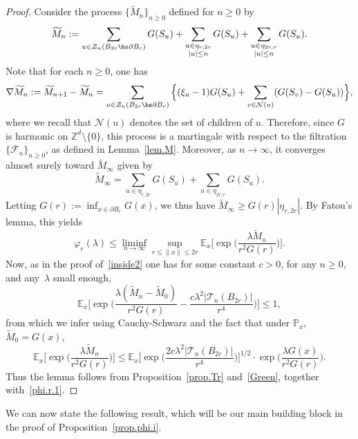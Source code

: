 \begin{proof}
Consider the process $\{\widetilde M_n\}_{n\ge 0}$
defined for $n\ge 0$ by
\begin{equation*}
\widetilde M_n := \sum_{u\in \mathcal Z_n(B_{2r}\bs \partial B_r)} G(S_u) +
\sum_{\substack{u\in \eta_{r,2r}\\ |u|\le n}}G(S_u)+
\sum_{\substack{u\in \eta_{2r,r}\\ |u|\le n}} G(S_u).
\end{equation*}
Note that for each $n\ge 0$, one has
\[
\nabla \widetilde M_n:= \widetilde M_{n+1}- \widetilde M_n =
\sum_{u\in \mathcal Z_n(B_{2r}\bs \partial B_r)}
\Big\{(\xi_u-1)G(S_u) + \sum_{v\in \mathcal N(u)}(G(S_v) - G(S_u))\Big\},
\]
where we recall that $\mathcal N(u)$ denotes the set of children of $u$.
Therefore, since $G$ is harmonic on $\mathbb Z^d\setminus \{0\}$, this process is a martingale with respect to the filtration
$\{\mathcal F_n\}_{n\ge 0}$, as defined in Lemma~\ref{lem.M}.
Moreover, as $n\to \infty$, it converges almost surely toward $\widetilde M_\infty$ given by
\begin{equation*}
\widetilde M_\infty = \sum_{u\in \eta_{r,2r}} G(S_u) + \sum_{u\in \eta_{2r,r}} G(S_u).
\end{equation*}
Letting $G(r):= \inf_{x\in \partial B_r} G(x)$, we thus have
$\widetilde M_\infty \ge G(r) |\eta_{r,2r}|$.
By Fatou's lemma, this yields
\begin{equation}\label{phi.r.1}
\varphi_r(\lambda) \le \liminf_{n\to \infty}\sup_{r\le \|x\|\le 2r}
\mathbb E_x\Big[\exp\Big(\frac{\lambda \widetilde M_n}{r^2G(r)}\Big)\Big].
\end{equation}
Now, as in the proof of~\eqref{inside2} one has for some constant $c>0$, for any $n\ge 0$, and any~$\lambda$ small enough,
\[
\mathbb E_x\Big[\exp\Big(\frac{\lambda (\widetilde M_n-\widetilde M_0)}
{r^2G(r)} - \frac{c\lambda^2|\mathcal T_n(B_{2r})|}{r^4}\Big)\Big] \le 1,
\]
from which we infer using Cauchy-Schwarz and the fact that under $\mathbb P_x$,
$\widetilde M_0=G(x)$,
\begin{equation*}
\mathbb E_x\Big[\exp\Big(\frac{\lambda \widetilde M_n}{r^2G(r)}\Big)\Big]
\le \mathbb E_x\Big[\exp\Big(\frac{2c\lambda^2
|\mathcal T_n(B_{2r})|}{r^4}\Big)\Big]^{1/2}
\cdot \exp\Big(\frac{\lambda G(x)}{r^2G(r)}\Big).
\end{equation*}
Thus the lemma follows from Proposition~\ref{prop.Tr} and~\eqref{Green}, together with~\eqref{phi.r.1}.
\end{proof}
We can now state the following result,
which will be our main building block in the proof of Proposition~\ref{prop.phi.i}.

